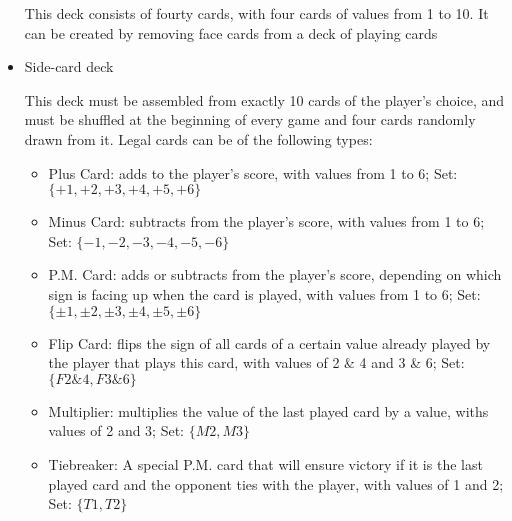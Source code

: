 \documentclass[12pt, landscape]{article}
\begin{document}
\begin{FlushLeft}
\begin{multicols}{2}
\begin{itemize}
				This deck consists of fourty cards, with four cards of values from 1 to 10. It can be created by removing face cards from a deck of playing cards

				\item Side-card deck

				This deck must be assembled from exactly 10 cards of the player's choice, and must be shuffled at the beginning of every game and four cards randomly drawn from it. Legal cards can be of the following types:

				\begin{itemize}
					\item Plus Card: adds to the player's score, with values from 1 to 6; Set: $\{+1, +2, +3, +4, +5, +6\}$
					\item Minus Card: subtracts from the player's score, with values from 1 to 6; Set: $\{-1, -2, -3, -4, -5, -6\}$
					\item P.M. Card: adds or subtracts from the player's score, depending on which sign is facing up when the card is played, with values from 1 to 6; Set: $\{\pm1, \pm2, \pm3, \pm4, \pm5, \pm6\}$
					\item Flip Card: flips the sign of all cards of a certain value already played by the player that plays this card, with values of 2 \& 4 and 3 \& 6; Set: $\{F2\&4, F3\&6\}$
					\item Multiplier: multiplies the value of the last played card by a value, withs values of 2 and 3; Set: $\{M2, M3\}$
					\item Tiebreaker: A special P.M. card that will ensure victory if it is the last played card and the opponent ties with the player, with values of 1 and 2; Set: $\{T1, T2\}$
				\end{itemize}
			\end{itemize}
			\vfill \null
		\end{multicols}
	\end{FlushLeft}
\end{document}
